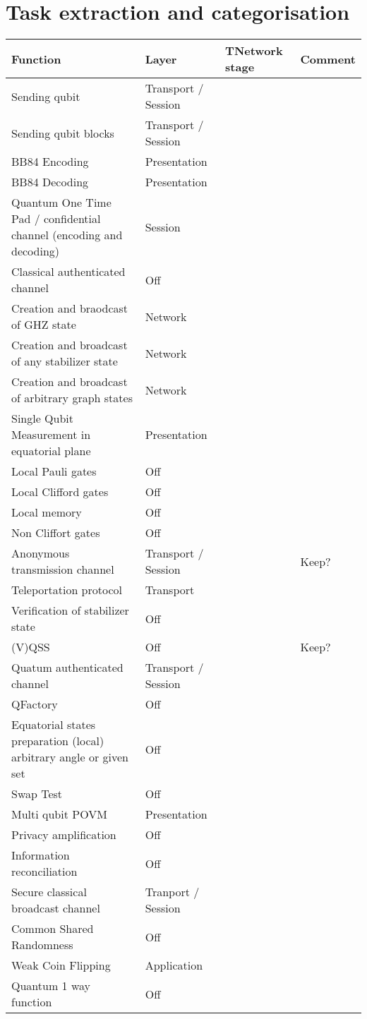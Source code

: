 \documentclass[11pt]{article}
\begin{document}
\section{Task extraction and categorisation}
\label{sec:org608ac1a}

\begin{center}
\begin{tabular}{llll}
Function & Layer & TNetwork stage & Comment\\
\hline
Sending qubit & Transport / Session &  & \\
\hline
Sending qubit blocks & Transport / Session &  & \\
\hline
BB84 Encoding & Presentation &  & \\
\hline
BB84 Decoding & Presentation &  & \\
\hline
Quantum One Time Pad / confidential channel (encoding and decoding) & Session &  & \\
\hline
Classical authenticated channel & Off &  & \\
\hline
Creation and braodcast of GHZ state & Network &  & \\
\hline
Creation and broadcast of any stabilizer state & Network &  & \\
\hline
Creation and broadcast of arbitrary graph states & Network &  & \\
\hline
Single Qubit Measurement in equatorial plane & Presentation &  & \\
\hline
Local Pauli gates & Off &  & \\
\hline
Local Clifford gates & Off &  & \\
\hline
Local memory & Off &  & \\
\hline
Non Cliffort gates & Off &  & \\
\hline
Anonymous transmission channel & Transport / Session &  & Keep?\\
\hline
Teleportation protocol & Transport &  & \\
\hline
Verification of stabilizer state & Off &  & \\
\hline
(V)QSS & Off &  & Keep?\\
\hline
Quatum authenticated channel & Transport / Session &  & \\
\hline
QFactory & Off &  & \\
\hline
Equatorial states preparation (local) arbitrary angle or given set & Off &  & \\
\hline
Swap Test & Off &  & \\
\hline
Multi qubit POVM & Presentation &  & \\
\hline
Privacy amplification & Off &  & \\
\hline
Information reconciliation & Off &  & \\
\hline
Secure classical broadcast channel & Tranport / Session &  & \\
\hline
Common Shared Randomness & Off &  & \\
\hline
Weak Coin Flipping & Application &  & \\
\hline
Quantum 1 way function & Off &  & \\
\hline
\end{tabular}
\end{center}
\end{document}
